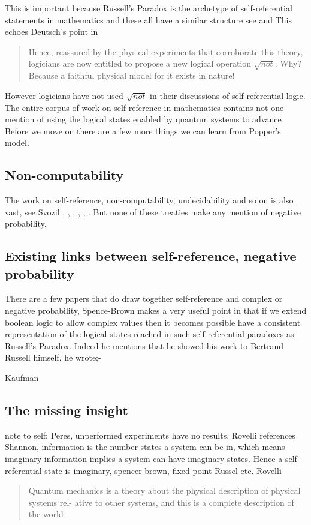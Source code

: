 \documentclass{article}
\begin{document}
This is important because Russell's Paradox is the archetype of self-referential statements in mathematics and these all have a similar structure see \autocite{Lawvere1969DiagonalCategories} and \autocite{Yanofsky2003} This echoes Deutsch's point in \autocite{deutsch_1999} 
\begin{quotation}
    Hence, reassured by the physical experiments that corroborate this theory, logicians are now entitled to propose a new logical operation $\sqrt{not}$. Why? Because a faithful physical model for it exists in nature!
\end{quotation}
However logicians have not used $\sqrt{not}$ in their discussions of self-referential logic. The entire corpus of work on self-reference in mathematics contains not one mention of using the 
logical states enabled by quantum systems to advance 
Before we move on there are a few more things we can learn from Popper's model. 
\subsection{Non-computability}
The work on self-reference, non-computability, undecidability and so on is also vast, see Svozil \autocite{svozil_k_2018b}, \autocite{sep-self-reference_2017}, \autocite{szangolies_2020, szangolies_j_2018} \autocite{Bartlett_S_1992, bartlett_S_J-1987}, \autocite{cook_2004, Cook_RT_2014}, \autocite{Yanofsky2003}, \autocite{Lawvere1969DiagonalCategories}. But none of these treaties make any mention of negative probability. 
\subsection{Existing links between self-reference, negative probability}
There are a few papers that do draw together self-reference and complex or negative probability, Spence-Brown makes a very useful point in \autocite{Spence-Brown-1969} that if we extend boolean logic to allow complex values then it becomes possible have a consistent representation of the logical states reached in such self-referential paradoxes as Russell's Paradox. Indeed he mentions that he showed his work to Bertrand Russell himself, he wrote;-

Kaufman  

\subsection{The missing insight}


note to self: Peres, unperformed experiments have no results. Rovelli \autocite{Rovelli1996a} references Shannon, information is the number states a system can be in, which means imaginary information implies a system can have imaginary states. Hence a self-referential state is imaginary, spencer-brown, fixed point Russel etc. 
Rovelli \autocite{Rovelli1996a}
\begin{quotation}
    Quantum mechanics is a theory about the
physical description of physical systems rel-
ative to other systems, and this is a complete
description of the world
\end{quotation}
\end{document}
